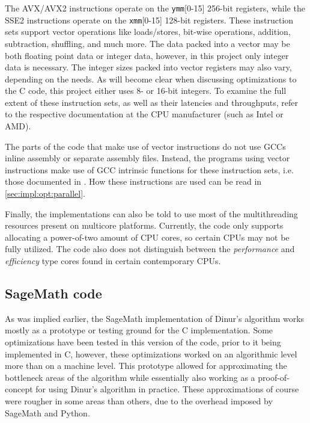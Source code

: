 The AVX/AVX2 instructions operate on the \texttt{ymm}[0-15] 256-bit registers, while the SSE2 instructions operate on the \texttt{xmm}[0-15] 128-bit registers. These instruction sets support vector operations like loads/stores, bit-wise operations, addition, subtraction, shuffling, and much more. The data packed into a vector may be both floating point data or integer data, however, in this project only integer data is necessary. The integer sizes packed into vector registers may also vary, depending on the needs. As will become clear when discussing optimizations to the C code, this project either uses 8- or 16-bit integers. To examine the full extent of these instruction sets, as well as their latencies and throughputs, refer to the respective documentation at the CPU manufacturer (such as Intel or AMD).

The parts of the code that make use of vector instructions do not use GCCs inline assembly or separate assembly files. Instead, the programs using vector instructions make use of GCC intrinsic functions for these instruction sets, i.e. those documented in \cite{IntelIntr}. How these instructions are used can be read in \cref{sec:impl:opt:parallel}.

Finally, the implementations can also be told to use most of the multithreading resources present on multicore platforms. Currently, the code only supports allocating a power-of-two amount of CPU cores, so certain CPUs may not be fully utilized. The code also does not distinguish between the \textit{performance} and \textit{efficiency} type cores found in certain contemporary CPUs.

\subsection{SageMath code} \label{sec:impl:sage}
As was implied earlier, the SageMath implementation of Dinur's algorithm works mostly as a prototype or testing ground for the C implementation. Some optimizations have been tested in this version of the code, prior to it being implemented in C, however, these optimizations worked on an algorithmic level more than on a machine level.  This prototype allowed for approximating the bottleneck areas of the algorithm while essentially also working as a proof-of-concept for using Dinur's algorithm in practice. These approximations of course were rougher in some areas than others, due to the overhead imposed by SageMath and Python.

